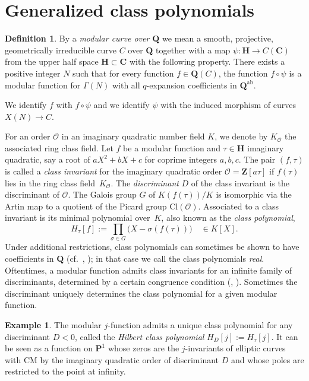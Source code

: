 \documentclass{amsart}
\newcommand{\QQ}{\mathbf{Q}}
\newcommand{\HH}{\mathbf{H}}
\newcommand{\CC}{\mathbf{C}}
\newcommand{\ZZ}{\mathbf{Z}}
\newcommand{\PP}{\mathbf{P}}
\newcommand{\Ff}{H_\tau[f]}
\newcommand{\Cl}{\mathrm{Cl}}
\newcommand{\mc}{\mathcal}
\newcommand{\curve}{C}
\numberwithin{equation}{section}
\theoremstyle{definition}
\newtheorem{definition}[equation]{Definition}
\newtheorem{example}[equation]{Example}
\begin{document}
	
	\section{Generalized class polynomials}\label{sec:section2}
	
\begin{definition}\label{def:modularcurve}
By a \emph{modular curve over $\QQ$}
we mean a smooth, projective, geometrically irreducible
curve $\curve$ over $\QQ$ together with a map $\psi : \HH\rightarrow \curve(\CC)$
from the upper half space $\HH\subset \CC$
with the following property.
There exists a positive integer $N$
such that for every function $f\in \QQ(\curve)$, the function
$f\circ \psi$ is a modular function for $\Gamma(N)$
with all $q$-expansion coefficients
in $\QQ^{\mathrm{ab}}$.

We identify $f$ with $f\circ \psi$
and we identify $\psi$ with the induced morphism of curves
$X(N)\rightarrow C$.
\end{definition}

For an order $\mc{O}$ in an imaginary quadratic number field $K$, 
we denote by $K_{\mc{O}}$ the associated ring class field.
Let $f$ be a modular function and $\tau\in\HH$ imaginary quadratic,
say a root of $aX^2+bX+c$ for coprime integers $a,b,c$.
The pair $(f,\tau)$ is called a \emph{class invariant} for the imaginary
quadratic order $\mc{O}=\ZZ[a\tau]$ if $f(\tau)$ lies in the ring class field~$K_{\mc{O}}$.
The \emph{discriminant} $D$ of the class invariant is the
discriminant of $\mc{O}$.
The Galois group $G$ of $K(f(\tau))/K$ is isomorphic
via the Artin map
to a quotient of the Picard group $\Cl(\mc{O})$.
Associated to a class invariant is its minimal polynomial over~$K$,
also known as the \emph{class polynomial},
\begin{equation*}
\Ff := \prod_{\sigma\in G}\big(X-\sigma(f(\tau))\big)\quad\in K[X].
\end{equation*}
Under additional restrictions, class polynomials
can sometimes be shown to have coefficients in $\QQ$ (cf.\ \cite[Thm.\ 4.4]{enge-morain2014}, 
\cite[Thm.\ 5.4]{enge-streng}); in that case we call the class polynomials \emph{real}.
Oftentimes, a modular function admits class invariants for an infinite family of discriminants, determined by a certain congruence condition
(\cite{schertz2002weber}, \cite[Thm.\ 4.3]{enge-morain2014}).
Sometimes the discriminant uniquely determines the class polynomial for a given modular function.

\begin{example}
The modular $j$-function admits a unique class polynomial for any discriminant $D<0$, called the \emph{Hilbert class polynomial} $H_D[j]:=H_\tau[j]$.
It can be seen as a function on $\PP^1$ whose zeros are
the $j$-invariants of elliptic curves with CM by the imaginary
quadratic order of discriminant $D$ and whose poles are restricted to the point at infinity.
\end{example}
\end{document}
